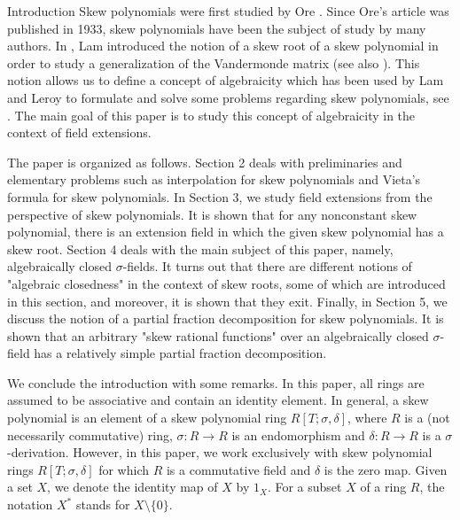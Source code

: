 \documentclass[11pt,a4paper]{article}
\theoremstyle{theorem}
\numberwithin{equation}{section}
\newcommand{\s}{\sigma}
\begin{document}
\begin{section}{Introduction} 
Skew polynomials were first studied by Ore \cite{ore1933theory}. Since Ore's article was published in 1933, skew polynomials have been the subject of study by many  authors. In \cite{lam1985general},  Lam introduced the notion of a skew root of a skew polynomial in order to study a generalization of the Vandermonde matrix (see also \cite{LamLeroy1988}). This notion allows us to define a concept of algebraicity which has been used by Lam and Leroy to formulate and solve some problems regarding skew polynomials, see  \cite{lam2004wedderburn,lam1994hilbert,lamleroy1988algebraic}.  The main goal of this paper is to study this concept of  algebraicity in the context of field extensions. 

The paper is organized as follows. Section 2 deals with preliminaries and elementary problems such as interpolation for skew polynomials and Vieta's formula for skew polynomials. In Section 3, we study field extensions from the perspective of skew polynomials. It is shown that for any nonconstant skew polynomial, there is an extension field in which the given skew polynomial has a skew root. Section 4 deals with the main subject of this paper, namely, algebraically closed $\s$-fields. It turns out that there are different notions of  "algebraic closedness" in the context of skew roots, some of which are introduced in this section, and moreover, it is shown that they exit.  Finally, in Section 5, we discuss the notion of a partial fraction decomposition for skew polynomials.  It is shown that an arbitrary  "skew rational  functions" over an algebraically closed $\s$-field has a relatively simple partial fraction decomposition.  
       
We conclude the introduction with some remarks. In this paper, all rings are assumed  to be associative and contain an identity element. In general, a skew polynomial is an element of a skew polynomial ring $R[T;\sigma,\delta]$, where $R$ is a (not necessarily commutative) ring, $\sigma:R\to R$ is an endomorphism
 and $\delta:R\to R$ is a $\s$-derivation. However, in this paper, we work exclusively with skew polynomial rings $R[T;\sigma,\delta]$ for which $R$ is a commutative field and $\delta$ is the zero map. Given a set $X$, we denote the identity map of $X$ by $1_X$. For a subset $X$ of a ring $R$, the notation $X^*$ stands for $X\setminus \{0\}$.

 
\end{section} 
\end{document}
